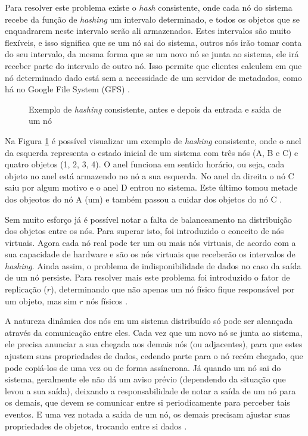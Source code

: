 \documentclass[diss]{template/setrem}
\begin{document}
Para resolver este problema existe o \emph{hash} consistente, onde cada nó do sistema recebe da função de \emph{hashing} um intervalo determinado, e todos os objetos que se enquadrarem neste intervalo serão ali armazenados. Estes intervalos são muito flexíveis, e isso significa que se um nó sai do sistema, outros nós irão tomar conta do seu intervalo, da mesma forma que se um novo nó se junta ao sistema, ele irá receber parte do intervalo de outro nó. Isso permite que clientes calculem em que nó determinado dado está sem a necessidade de um servidor de metadados, como há no Google File System (GFS) \citep{Strauch2011}.

\begin{figure}[!h]
    \caption{Exemplo de \emph{hashing} consistente, antes e depois da entrada e saída de um nó}
    \label{fig:consistent-hashing}
\end{figure}

Na Figura \ref{fig:consistent-hashing} é possível visualizar um exemplo de \emph{hashing} consistente, onde o anel da esquerda representa o estado inicial de um sistema com três nós (A, B e C) e quatro objetos (1, 2, 3, 4). O anel funciona em sentido horário, ou seja, cada objeto no anel está armazendo no nó a sua esquerda. No anel da direita o nó C saiu por algum motivo e o anel D entrou no sistema. Este último tomou metade dos objeotos do nó A (um) e também passou a cuidar dos objetos do nó C \citep{Strauch2011}.

Sem muito esforço já é possível notar a falta de balanceamento na distribuição dos objetos entre os nós. Para superar isto, foi introduzido o conceito de nós virtuais. Agora cada nó real pode ter um ou mais nós virtuais, de acordo com a sua capacidade de hardware e são os nós virtuais que receberão os intervalos de \emph{hashing}. Ainda assim, o problema de indisponibilidade de dados no caso da saída de um nó persiste. Para resolver mais este problema foi introduzido o fator de replicação ($r$), determinando que não apenas um nó físico fique responsável por um objeto, mas sim $r$ nós físicos \citep{Strauch2011}.

A natureza dinâmica dos nós em um sistema distribuído só pode ser alcançada através da comunicação entre eles. Cada vez que um novo nó se junta ao sistema, ele precisa anunciar a sua chegada aos demais nós (ou adjacentes), para que estes ajustem suas propriedades de dados, cedendo parte para o nó recém chegado, que pode copiá-los de uma vez ou de forma assíncrona. Já quando um nó sai do sistema, geralmente ele não dá um aviso prévio (dependendo da situação que levou a sua saída), deixando a responsabilidade de notar a saída de um nó para os demais, que devem se comunicar entre si periodicamente para perceber tais eventos. E uma vez notada a saída de um nó, os demais precisam ajustar suas propriedades de objetos, trocando entre si dados \citep{Strauch2011}.
\end{document}
